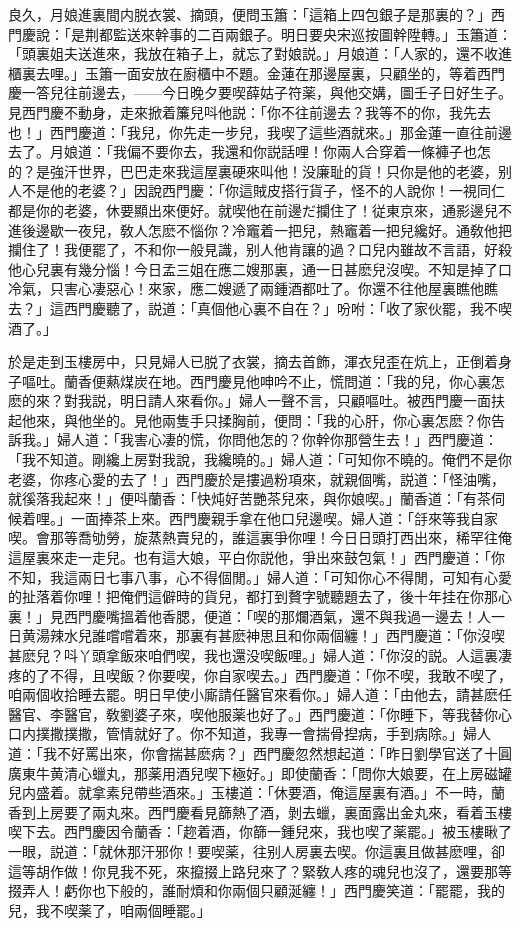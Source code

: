 良久，月娘進裏間内脱衣裳、摘頭，便問玉簫：「這箱上四包銀子是那裏的？」西門慶說：「是荆都監送來幹事的二百兩銀子。明日要央宋巡按圖幹陞轉。」玉簫道：「頭裏姐夫送進來，我放在箱子上，就忘了對娘説。」月娘道：「人家的，還不收進櫃裏去哩。」玉簫一面安放在廚櫃中不題。金蓮在那邊屋裏，只顧坐的，等着西門慶一答兒往前邊去，——今日晚夕要喫薛姑子符薬，與他交媾，圖壬子日好生子。見西門慶不動身，走來掀着簾兒呌他説：「你不往前邊去？我等不的你，我先去也！」西門慶道：「我兒，你先走一步兒，我喫了這些酒就來。」那金蓮一直往前邊去了。月娘道：「我偏不要你去，我還和你説話哩！你兩人合穿着一條褲子也怎的？是強汗世界，巴巴走來我這屋裏硬來叫他！没廉耻的貨！只你是他的老婆，别人不是他的老婆？」因說西門慶：「你這賊皮搭行貨子，怪不的人說你！一視同仁都是你的老婆，休要顯出來便好。就喫他在前邊だ攔住了！従東京來，通影邊兒不進後邊歇一夜兒，敎人怎麽不惱你？冷竈着一把兒，熱竈着一把兒纔好。通敎他把攔住了！我便罷了，不和你一般見識，别人他肯讓的過？口兒内雖故不言語，好殺他心兒裏有幾分惱！今日孟三姐在應二嫂那裏，通一日甚麽兒沒喫。不知是掉了口冷氣，只害心凄惡心！來家，應二嫂遞了兩鍾酒都吐了。你還不往他屋裏瞧他瞧去？」這西門慶聽了，説道：「真個他心裏不自在？」吩咐：「收了家伙罷，我不喫酒了。」

於是走到玉樓房中，只見婦人已脱了衣裳，摘去首飾，渾衣兒歪在炕上，正倒着身子嘔吐。蘭香便爇煤炭在地。西門慶見他呻吟不止，慌問道：「我的兒，你心裏怎麽的來？對我説，明日請人來看你。」婦人一聲不言，只顧嘔吐。被西門慶一面扶起他來，與他坐的。見他兩隻手只揉胸前，便問：「我的心肝，你心裏怎麽？你告訴我。」婦人道：「我害心凄的慌，你問他怎的？你幹你那營生去！」西門慶道：「我不知道。剛纔上房對我說，我纔曉的。」婦人道：「可知你不曉的。俺們不是你老婆，你疼心愛的去了！」西門慶於是摟過粉項來，就親個嘴，説道：「怪油嘴，就徯落我起來！」便呌蘭香：「快炖好苦艷茶兒來，與你娘喫。」蘭香道：「有茶伺候着哩。」一面捧茶上來。西門慶親手拿在他口兒邊喫。婦人道：「㧱來等我自家喫。會那等喬劬勞，旋蒸熱賣兒的，誰這裏爭你哩！今日日頭打西出來，稀罕往俺這屋裏來走一走兒。也有這大娘，平白你説他，爭出來鼓包氣！」西門慶道：「你不知，我這兩日七事八事，心不得個閒。」婦人道：「可知你心不得閒，可知有心愛的扯落着你哩！把俺們這僻時的貨兒，都打到贅字號聽題去了，後十年挂在你那心裏！」見西門慶嘴搵着他香腮，便道：「喫的那爛酒氣，還不與我過一邊去！人一日黄湯辣水兒誰嚐嚐着來，那裏有甚麽神思且和你兩個纏！」西門慶道：「你沒喫甚麽兒？呌丫頭拿飯來咱們喫，我也還没喫飯哩。」婦人道：「你沒的説。人這裏凄疼的了不得，且喫飯？你要喫，你自家喫去。」西門慶道：「你不喫，我敢不喫了，咱兩個收拾睡去罷。明日早使小廝請任醫官來看你。」婦人道：「由他去，請甚麽任醫官、李醫官，敎劉婆子來，喫他服薬也好了。」西門慶道：「你睡下，等我替你心口内撲撒撲撒，管情就好了。你不知道，我專一會揣骨揑病，手到病除。」婦人道：「我不好罵出來，你會揣甚麽病？」西門慶忽然想起道：「昨日劉學官送了十圓廣東牛黄清心蠟丸，那薬用酒兒喫下極好。」即使蘭香：「問你大娘要，在上房磁罐兒内盛着。就拿素兒帶些酒來。」玉樓道：「休要酒，俺這屋裏有酒。」不一時，蘭香到上房要了兩丸來。西門慶看見篩熱了酒，剝去蠟，裏面露出金丸來，看着玉樓喫下去。西門慶因令蘭香：「趂着酒，你篩一鍾兒來，我也喫了薬罷。」被玉樓瞅了一眼，説道：「就休那汗邪你！要喫薬，往别人房裏去喫。你這裏且做甚麽哩，卻這等胡作做！你見我不死，來攛掇上路兒來了？緊敎人疼的魂兒也沒了，還要那等掇弄人！虧你也下般的，誰耐煩和你兩個只顧涎纏！」西門慶笑道：「罷罷，我的兒，我不喫薬了，咱兩個睡罷。」

